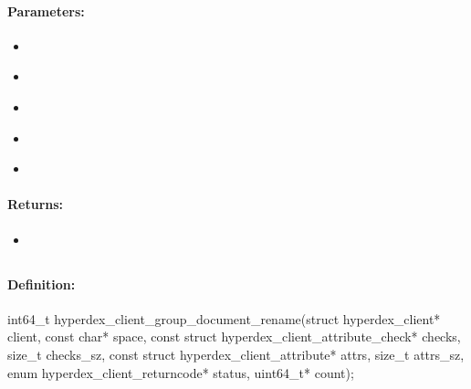 \paragraph{Parameters:}
\begin{itemize}[noitemsep]
\item {}\\

\item {}\\

\item {}\\

\item {}\\

\item {}\\

\end{itemize}

\paragraph{Returns:}
\begin{itemize}[noitemsep]
\item {}\\

\end{itemize}

\pagebreak
\subsection{}
\label{api:c:group_document_rename}


\paragraph{Definition:}
\begin{ccode}
int64_t hyperdex_client_group_document_rename(struct hyperdex_client* client,
        const char* space,
        const struct hyperdex_client_attribute_check* checks, size_t checks_sz,
        const struct hyperdex_client_attribute* attrs, size_t attrs_sz,
        enum hyperdex_client_returncode* status,
        uint64_t* count);
\end{ccode}

